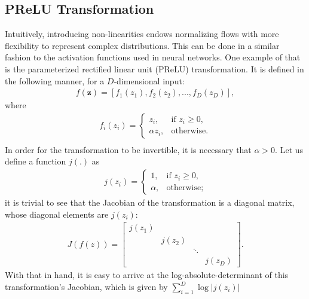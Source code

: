 \subsection{PReLU Transformation}
Intuitively, introducing non-linearities endows normalizing flows with more flexibility to
represent complex distributions. This can be done in a similar fashion to the
activation functions used in neural networks. One example of that is the parameterized
rectified linear unit (PReLU) transformation. It is defined in the following manner, for
a $D$-dimensional input:
\begin{align}
f(\bm{z}) = [f_1(z_1), f_2(z_2), ..., f_D(z_D)],
\end{align} where
\begin{align}
f_i(z_i) =
    \begin{cases}
        z_i,              & \text{if } z_i\geq 0, \\
        \alpha z_i,       & \text{otherwise}.
    \end{cases} \\
\end{align}
In order for the transformation to be invertible, it is necessary
that $\alpha > 0$.
Let us define a function $j(.)$ as
\begin{align}
j(z_i) =
    \begin{cases}
       1 ,              & \text{if } z_i \geq 0, \\
       \alpha ,       & \text{otherwise};
    \end{cases}
\end{align}
it is trivial to see that the Jacobian of the transformation is a diagonal
matrix, whose diagonal elements are $j(z_i)$:
\begin{align}
  J(f(z)) =
  \begin{bmatrix}
      j(z_1) & & & \\
      & j(z_2) & & \\
      & & \ddots & \\
      & & & j(z_D)
  \end{bmatrix}.
\end{align}
With that in hand, it is easy to arrive at the log-absolute-determinant of this transformation's
Jacobian, which is given by $\sum_{i=1}^D \log \big| j(z_i) \big|$

